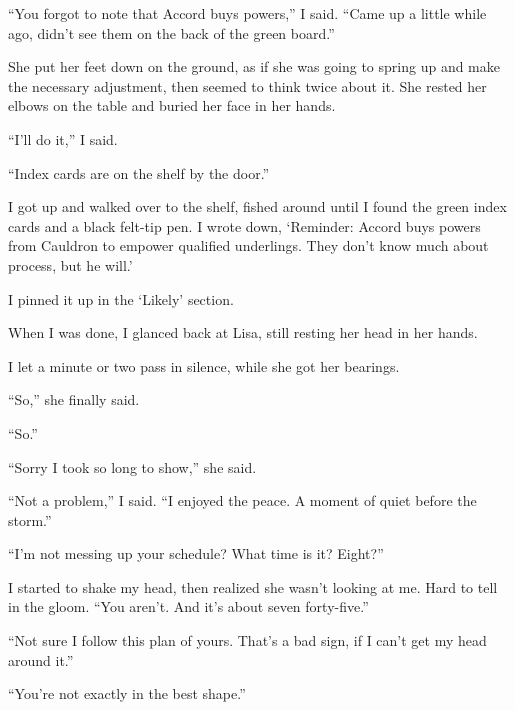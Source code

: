 ``You forgot to note that Accord buys powers,'' I said.  ``Came up a little while ago, didn't see them on the back of the green board.''



She put her feet down on the ground, as if she was going to spring up and make the necessary adjustment, then seemed to think twice about it.  She rested her elbows on the table and buried her face in her hands.



``I'll do it,'' I said.



``Index cards are on the shelf by the door.''



I got up and walked over to the shelf, fished around until I found the green index cards and a black felt-tip pen.  I wrote down, `Reminder: Accord buys powers from Cauldron to empower qualified underlings.  They don't know much about process, but he will.'



I pinned it up in the `Likely' section.



When I was done, I glanced back at Lisa, still resting her head in her hands.



I let a minute or two pass in silence, while she got her bearings.



``So,'' she finally said.



``So.''



``Sorry I took so long to show,'' she said.



``Not a problem,'' I said.  ``I enjoyed the peace.  A moment of quiet before the storm.''



``I'm not messing up your schedule?  What time is it?  Eight?''



I started to shake my head, then realized she wasn't looking at me.  Hard to tell in the gloom.  ``You aren't.  And it's about seven forty-five.''



``Not sure I follow this plan of yours.  That's a bad sign, if I can't get my head around it.''



``You're not exactly in the best shape.''



